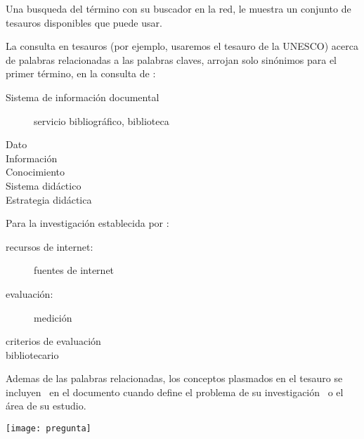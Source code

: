 Una busqueda del t\'ermino  con su buscador en la red, le muestra un conjunto de tesauros disponibles que puede usar. 



La consulta en tesauros (por ejemplo, usaremos el tesauro de la UNESCO) acerca de palabras relacionadas a las palabras claves, arrojan solo sinónimos para el primer término, en la consulta de : 



\begin{description}
	\item[Sistema de información documental] servicio bibliográfico, biblioteca
	\item [Dato]
	\item [Información]
	\item [Conocimiento]
	\item [Sistema didáctico]
	\item [Estrategia didáctica ]
\end{description}


Para la investigación establecida por : 


\begin{description}
	\item [recursos de internet:]  fuentes de internet
	\item [evaluación:]  medición
	\item [criterios de evaluación]
	\item [bibliotecario ]
\end{description}

 

Ademas de las palabras relacionadas, los conceptos plasmados en el tesauro se incluyen  en el documento cuando define el problema de su investigación  o el área de su estudio.

\begin{marginfigure}[1.2cm]%
	\texttt{[image: pregunta]}
\end{marginfigure}
